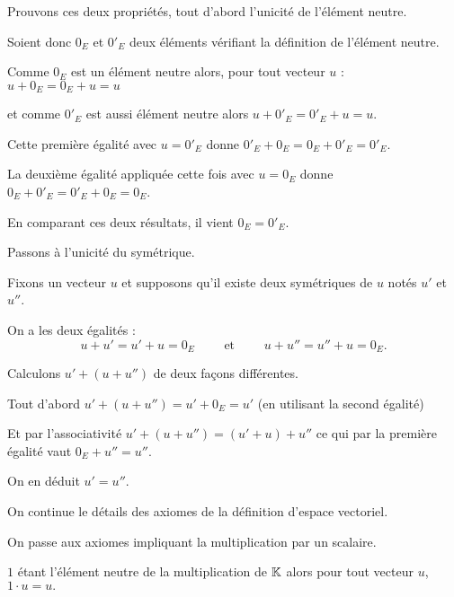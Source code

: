 \change

Prouvons ces deux propriétés, tout d'abord l'unicité de l'élément neutre.

Soient donc $0_{E}$ et $0'_{E}$ deux éléments vérifiant 
  la définition de l'élément neutre. 

  \change
  
  Comme $0_{E}$ est un élément neutre alors, pour tout vecteur $u$ :
$u + 0_{E}=0_{E}+u=u $

et comme $0'_{E}$ est aussi élément neutre alors $u + 0'_{E}=0'_{E}+u=u$.

\change

Cette première égalité  avec $u=0'_{E}$ donne $0'_{E}+0_{E}=0_{E}+0'_{E}=0'_{E}$.

\change

La deuxième égalité appliquée cette fois avec $u=0_{E}$ donne $0_{E}+0'_{E}=0'_{E}+0_{E}=0_{E}$.

\change

En comparant ces deux résultats, il vient $0_{E}=0'_{E}$.

\change

Passons à l'unicité du symétrique.

Fixons un vecteur $u$ et supposons qu'il existe deux symétriques de $u$ notés $u'$ et $u''$. 

\change

On a les deux égalités :
$$u+u'=u'+u=0_{E}  \qquad \text{ et } \qquad u+u''=u''+u=0_{E}.$$

\change

Calculons $u'+(u+u'')$ de deux façons différentes. 

Tout d'abord $u'+(u+u'')= u'+ 0_{E}= u'$ (en utilisant la second égalité)

\change

Et par l'associativité $u'+(u+u'')=(u'+u)+u''$ ce qui par la première égalité vaut $0_{E}+u''=u''$.

\change

On en déduit $u'=u''$. 


\diapo

On continue le détails des axiomes de la définition d'espace vectoriel. 

\change

On passe aux axiomes impliquant la multiplication par un scalaire.


 $1$ étant l'élément neutre de la multiplication de $\mathbb{K}$ alors
 pour tout vecteur $u$, $1 \cdot u=u.$
 
